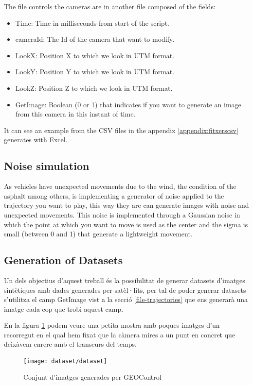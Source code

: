 \documentclass[10pt,a4paper,twocolumn,twoside]{article}
\begin{document}
The file controls the cameras are in another file composed of the fields:

\begin{itemize}
\item Time: Time in milliseconds from start of the script.
\item cameraId: The Id of the camera that want to modify.
\item LookX: Position X to which we look in UTM format.
\item LookY: Position Y to which we look in UTM format.
\item LookZ: Position Z to which we look in UTM format.
\item GetImage: Boolean (0 or 1) that indicates if you want to generate an image from this camera in this instant of time.
\end{itemize}

It can see an example from the CSV files in the appendix \ref{appendix:fitxerscsv} generates with Excel.

\subsection{Noise simulation}

As vehicles have unexpected movements due to the wind, the condition of the asphalt among others, is implementing a generator of noise applied to the trajectory you want to play, this way they are can generate images with noise and unexpected movements. This noise is implemented through a Gaussian noise in which the point at which you want to move is used as the center and the sigma is small (between 0 and 1) that generate a lightweight movement.

\subsection{Generation of Datasets}
Un dels objectius d'aquest treball és la possibilitat de generar datasets d'imatges sintètiques amb dades generades per satèl·lits, per tal de poder generar datasets s'utilitza el camp GetImage vist a la secció \ref{file-trajectories} que ens generarà una imatge cada cop que trobi aquest camp.

En la figura \ref{fig-dataset} podem veure una petita mostra amb poques imatges d'un recorregut en el qual hem fixat que la càmera mires a un punt en concret que deixàvem enrere amb el transcurs del temps. 

\begin{figure}[!h]
\centering
  	\texttt{[image: dataset/dataset]}
	\caption{Conjunt d'imatges generades per GEOControl}
	\label{fig-dataset}
\end{figure}
\end{document}
